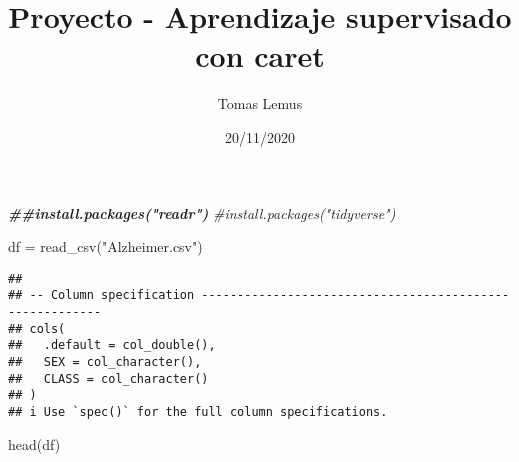 \documentclass[
]{article}
\title{Proyecto - Aprendizaje supervisado con caret}
\author{Tomas Lemus}
\date{20/11/2020}
\newenvironment{Shaded}{\begin{snugshade}}{\end{snugshade}}
\newcommand{\CommentTok}[1]{\textcolor[rgb]{0.56,0.35,0.01}{\textit{#1}}}
\newcommand{\DocumentationTok}[1]{\textcolor[rgb]{0.56,0.35,0.01}{\textbf{\textit{#1}}}}
\newcommand{\FunctionTok}[1]{\textcolor[rgb]{0.00,0.00,0.00}{#1}}
\newcommand{\NormalTok}[1]{#1}
\newcommand{\OtherTok}[1]{\textcolor[rgb]{0.56,0.35,0.01}{#1}}
\newcommand{\StringTok}[1]{\textcolor[rgb]{0.31,0.60,0.02}{#1}}
\begin{document}
\maketitle

\begin{Shaded}
\begin{Highlighting}[]
\DocumentationTok{\#\#install.packages("readr")}
\CommentTok{\#install.packages("tidyverse")}
\end{Highlighting}
\end{Shaded}

\begin{Shaded}
\begin{Highlighting}[]
\NormalTok{df }\OtherTok{=} \FunctionTok{read\_csv}\NormalTok{(}\StringTok{"Alzheimer.csv"}\NormalTok{)}
\end{Highlighting}
\end{Shaded}

\begin{verbatim}
## 
## -- Column specification --------------------------------------------------------
## cols(
##   .default = col_double(),
##   SEX = col_character(),
##   CLASS = col_character()
## )
## i Use `spec()` for the full column specifications.
\end{verbatim}

\begin{Shaded}
\begin{Highlighting}[]
\FunctionTok{head}\NormalTok{(df)}
\end{Highlighting}
\end{Shaded}
\end{document}
